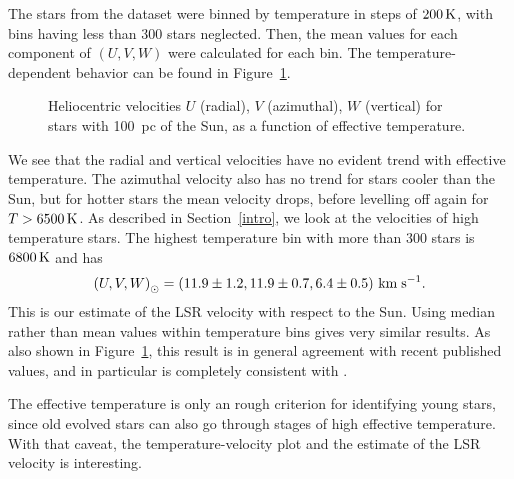 \documentclass{aastex62}
\begin{document}
The stars from the dataset were binned by temperature in steps of $200\rm\,K$, with bins having less than 300 stars neglected. Then, the mean values for each component of $\left( U, V, W\right)$ were calculated for each bin. The temperature-dependent behavior can be found in Figure~\ref{fig:lsrmean}.

	\begin{figure}[ht!]
	\caption{Heliocentric velocities $U$ (radial), $V$ (azimuthal), $W$ (vertical) for stars with 100~pc of the Sun, as a function of effective temperature.\label{fig:lsrmean}}
	\end{figure}

We see that the radial and vertical velocities have no evident trend with effective temperature.  The azimuthal velocity also has no trend for stars cooler than the Sun, but for hotter stars the mean velocity drops, before levelling off again for $T>6500\rm\,K$.  As described in Section~\ref{intro}, we look at the velocities of high temperature stars. The highest temperature bin with more than 300 stars is $6800\rm\,K$ and has
$$ \left( U, V, W\right)_\odot=\left( 11.9\pm1.2, 11.9\pm0.7, 6.4\pm0.5 \right) \rm\,km\;s^{-1}.$$
This is our estimate of the LSR velocity with respect to the Sun.  Using median rather than mean values within temperature bins gives very similar results. As also shown in Figure~\ref{fig:lsrmean}, this result is in general agreement with recent published values, and in particular is completely consistent with \cite{schoenrich}.

The effective temperature is only an rough criterion for identifying
young stars, since old evolved stars can also go through stages of
high effective temperature.  With that caveat, the temperature-velocity
plot and the estimate of the LSR velocity is interesting.



\end{document}
